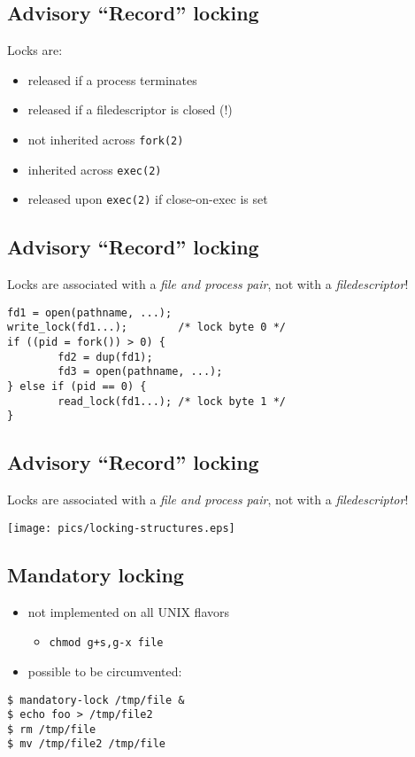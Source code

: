 \documentclass[xga]{xdvislides}
\begin{document}
\subsection{Advisory ``Record'' locking}
Locks are:
\begin{itemize}
	\item released if a process terminates
	\item released if a filedescriptor is closed (!)
	\item not inherited across {\tt fork(2)}
	\item inherited across {\tt exec(2)}
	\item released upon {\tt exec(2)} if close-on-exec is set
\end{itemize}

\subsection{Advisory ``Record'' locking}
Locks are associated with a {\em file and process pair}, not with a {\em filedescriptor}!
\begin{verbatim}
fd1 = open(pathname, ...);
write_lock(fd1...);        /* lock byte 0 */
if ((pid = fork()) > 0) {
        fd2 = dup(fd1);
        fd3 = open(pathname, ...);
} else if (pid == 0) {
        read_lock(fd1...); /* lock byte 1 */
}
\end{verbatim}

\subsection{Advisory ``Record'' locking}
Locks are associated with a {\em file and process pair}, not with a {\em filedescriptor}!
\begin{center}
	\texttt{[image: pics/locking-structures.eps]}
\end{center}

\subsection{Mandatory locking}
\begin{itemize}
	\item not implemented on all UNIX flavors
		\begin{itemize}
			\item {\tt chmod g+s,g-x file}
		\end{itemize}
	\item possible to be circumvented:
\end{itemize}
\begin{verbatim}
$ mandatory-lock /tmp/file &
$ echo foo > /tmp/file2
$ rm /tmp/file
$ mv /tmp/file2 /tmp/file
\end{verbatim}
\end{document}
